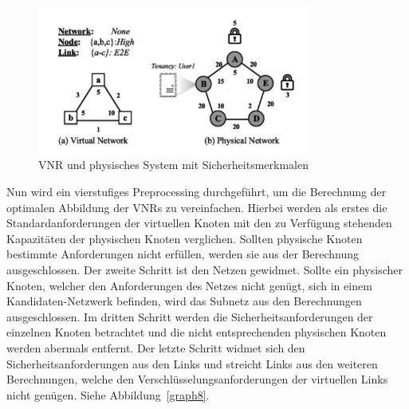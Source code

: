 \documentclass{lni}
\begin{document}
\begin{figure}[htb]
\begin{center}
\includegraphics[width=0.8\textwidth]{SVNR.pdf}\newline
\caption{\label{graph7}VNR und physisches System mit Sicherheitsmerkmalen \cite{wang2016towards}}
\end{center}
\end{figure}

Nun wird ein vierstufiges Preprocessing durchgeführt, um die Berechnung der optimalen Abbildung der VNRs zu vereinfachen. Hierbei werden als erstes die Standardanforderungen der virtuellen Knoten mit den zu Verfügung stehenden Kapazitäten der physischen Knoten verglichen. Sollten physische Knoten bestimmte Anforderungen nicht erfüllen, werden sie aus der Berechnung ausgeschlossen. Der zweite Schritt ist den Netzen gewidmet. Sollte ein physischer Knoten, welcher den Anforderungen des Netzes nicht genügt, sich in einem Kandidaten-Netzwerk befinden, wird das Subnetz aus den Berechnungen ausgeschlossen. Im dritten Schritt werden die Sicherheitsanforderungen der einzelnen Knoten betrachtet und die nicht entsprechenden physischen Knoten werden abermals entfernt. Der letzte Schritt widmet sich den Sicherheitsanforderungen aus den Links und streicht Links aus den weiteren Berechnungen, welche den Verschlüsselungsanforderungen der virtuellen Links nicht genügen. Siehe Abbildung~\ref{graph8}.
\end{document}
